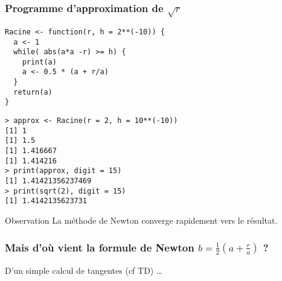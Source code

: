 \documentclass[10pt]{beamer}
\begin{document}
\begin{frame}[fragile]
  \frametitle{Programme d'approximation de $\sqrt{r}$}
  \begin{lstlisting}[style=editor]
Racine <- function(r, h = 2**(-10)) {
  a <- 1
  while( abs(a*a -r) >= h) {
    print(a)
    a <- 0.5 * (a + r/a)
  }
  return(a)
}    
\end{lstlisting}

\begin{lstlisting}
> approx <- Racine(r = 2, h = 10**(-10))
[1] 1
[1] 1.5
[1] 1.416667
[1] 1.414216
> print(approx, digit = 15)
[1] 1.41421356237469
> print(sqrt(2), digit = 15)
[1] 1.4142135623731
\end{lstlisting}

\begin{block}{Observation}
  La méthode de Newton converge rapidement vers le résultat.
\end{block}
\end{frame}

\begin{frame}
  \frametitle{Mais d'où vient la formule de Newton  $b = \frac{1}{2}(a + \frac{r}{a})$ ?}

  D'un simple calcul de tangentes (cf TD) \dots
  
  \begin{center}
  \end{center}
\end{frame}
\end{document}
